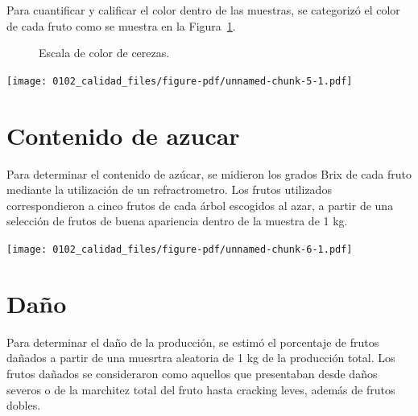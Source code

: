 \documentclass[
  letterpaper,
  DIV=11,
  numbers=noendperiod]{scrreprt}
\begin{document}
Para cuantificar y calificar el color dentro de las muestras, se
categorizó el color de cada fruto como se muestra en la
Figura~\ref{fig-escala}.

\begin{figure}


\caption{\label{fig-escala}Escala de color de cerezas.}

\end{figure}%

\begin{center}
\texttt{[image: 0102\_calidad\_files/figure-pdf/unnamed-chunk-5-1.pdf]}
\end{center}

\section{Contenido de azucar}\label{contenido-de-azucar}

Para determinar el contenido de azúcar, se midieron los grados Brix de
cada fruto mediante la utilización de un refractrometro. Los frutos
utilizados correspondieron a cinco frutos de cada árbol escogidos al
azar, a partir de una selección de frutos de buena apariencia dentro de
la muestra de 1 kg.

\begin{center}
\texttt{[image: 0102\_calidad\_files/figure-pdf/unnamed-chunk-6-1.pdf]}
\end{center}

\section{Daño}\label{dauxf1o}

Para determinar el daño de la producción, se estimó el porcentaje de
frutos dañados a partir de una muesrtra aleatoria de 1 kg de la
producción total. Los frutos dañados se consideraron como aquellos que
presentaban desde daños severos o de la marchitez total del fruto hasta
cracking leves, además de frutos dobles.
\end{document}
